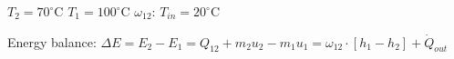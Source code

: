 \( T_2 = 70^\circ \text{C} \)  
\( T_1 = 100^\circ \text{C} \)  
\( \omega_{12} \):  
\( T_{in} = 20^\circ \text{C} \)  

Energy balance:  
\( \Delta E = E_2 - E_1 = Q_{12} + m_2 u_2 - m_1 u_1 = \omega_{12} \cdot [h_1 - h_2] + \dot{Q}_{out} \)